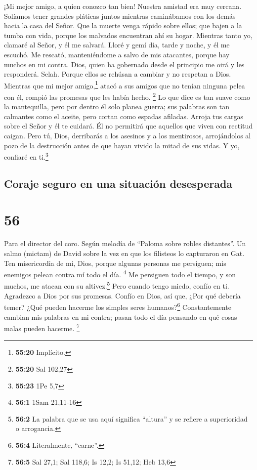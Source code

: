 ¡Mi mejor amigo, a quien conozco tan bien!  Nuestra
amistad era muy cercana. Solíamos tener grandes pláticas juntos mientras
caminábamos con los demás hacia la casa del Señor.  Que
la muerte venga rápido sobre ellos; que bajen a la tumba con vida,
porque los malvados encuentran ahí su hogar.  Mientras
tanto yo, clamaré al Señor, y él me salvará.  Lloré y
gemí día, tarde y noche, y él me escuchó.  Me rescató,
manteniéndome a salvo de mis atacantes, porque hay muchos en mi contra.
 Dios, quien ha gobernado desde el principio me oirá y
les responderá. Selah. Porque ellos se rehúsan a cambiar y no respetan a
Dios.  Mientras que mi mejor amigo,\footnote{\textbf{55:20}
  Implícito.} atacó a sus amigos que no tenían ninguna pelea con él,
rompió las promesas que les había hecho. \footnote{\textbf{55:20} Sal
  102,27}  Lo que dice es tan suave como la mantequilla,
pero por dentro él solo planea guerra; sus palabras son tan calmantes
como el aceite, pero cortan como espadas afiladas. 
Arroja tus cargas sobre el Señor y él te cuidará. Él no permitirá que
aquellos que viven con rectitud caigan.  Pero tú, Dios,
derribarás a los asesinos y a los mentirosos, arrojándolos al pozo de la
destrucción antes de que hayan vivido la mitad de sus vidas. Y yo,
confiaré en ti.\footnote{\textbf{55:23} 1Pe 5,7}

\hypertarget{coraje-seguro-en-una-situaciuxf3n-desesperada}{%
\subsection{Coraje seguro en una situación
desesperada}\label{coraje-seguro-en-una-situaciuxf3n-desesperada}}

\hypertarget{section-55}{%
\section{56}\label{section-55}}

Para el director del coro. Según melodía de ``Paloma sobre robles
distantes''. Un salmo (mictam) de David sobre la vez en que los
filisteos lo capturaron en Gat.  Ten misericordia de mi,
Dios, porque algunas personas me persiguen; mis enemigos pelean contra
mí todo el día. \footnote{\textbf{56:1} 1Sam 21,11-16}  Me
persiguen todo el tiempo, y son muchos, me atacan con su
altivez.\footnote{\textbf{56:2} La palabra que se usa aquí significa
  ``altura'' y se refiere a superioridad o arrogancia.} 
Pero cuando tengo miedo, confío en ti.  Agradezco a Dios
por sus promesas. Confío en Dios, así que, ¿Por qué debería temer? ¿Qué
pueden hacerme los simples seres humanos?\footnote{\textbf{56:4}
  Literalmente, ``carne''.}  Constantemente cambian mis
palabras en mi contra; pasan todo el día pensando en qué cosas malas
pueden hacerme. \footnote{\textbf{56:5} Sal 27,1; Sal 118,6; Is 12,2; Is
  51,12; Heb 13,6}

